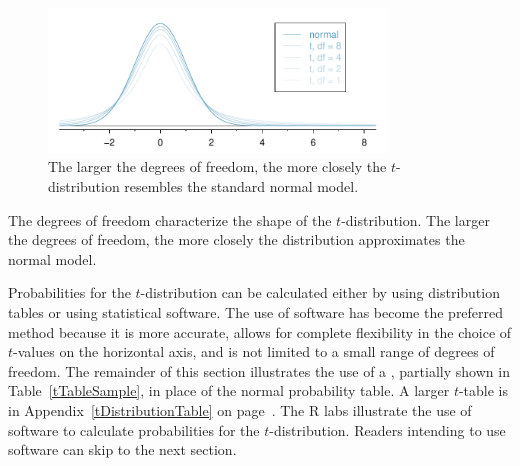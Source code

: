 \begin{figure}
\centering
\includegraphics[width=0.8\textwidth]{ch_inference_for_means_oi_biostat/figures/tDistConvergeToNormalDist/tDistConvergeToNormalDist}
\caption{The larger the degrees of freedom, the more closely the $t$-distribution resembles the standard normal model.}
\label{tDistConvergeToNormalDist}
\end{figure}

\begin{termBox}{
The degrees of freedom characterize the shape of the $t$-distribution. The larger the degrees of freedom, the more closely the distribution approximates the normal model.}
\end{termBox}

Probabilities for the $t$-distribution can be calculated either by using distribution tables or using statistical software. The use of software has become the preferred method because it is more accurate, allows for complete flexibility in the choice of $t$-values on the horizontal axis, and is not limited to a small range of degrees of freedom. The remainder of this section illustrates the use of a , partially shown in Table~\ref{tTableSample}, in place of the normal probability table. A larger $t$-table is in Appendix~\ref{tDistributionTable} on page~\pageref{tDistributionTable}.  The \textsf{R} labs illustrate the use of software to calculate probabilities for the $t$-distribution.  Readers intending to use software can skip to the next section.


